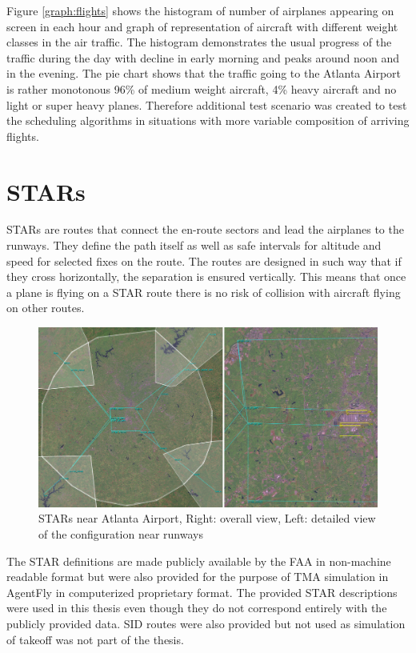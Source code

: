 Figure \ref{graph:flights} shows the histogram of number of airplanes appearing on screen in each hour and graph of representation of aircraft with different weight classes in the air traffic. The histogram demonstrates the usual progress of the traffic during the day with decline in early morning and peaks around noon and in the evening. The pie chart shows that the traffic going to the Atlanta Airport is rather monotonous 96\% of medium weight aircraft, 4\% heavy aircraft and no light or super heavy planes. Therefore additional test scenario was created to test the scheduling algorithms in situations with more variable composition of arriving flights.

\section{STARs}

STARs are routes that connect the en-route sectors and lead the airplanes to the runways. They define the path itself as well as safe intervals for altitude and speed for selected fixes on the route. The routes are designed in such way that if they cross horizontally, the separation is ensured vertically. This means that once a plane is flying on a STAR route there is no risk of collision with aircraft flying on other routes.

\begin{figure}[h]
    \centering
    \includegraphics[width=\textwidth]{figures/routes.png}
    \caption{STARs near Atlanta Airport, Right: overall view, Left: detailed view of the configuration near runways}
    \label{fig:routes}
\end{figure}

The STAR definitions are made publicly available by the FAA in non-machine readable format but were also provided for the purpose of TMA simulation in AgentFly in computerized proprietary format. The provided STAR descriptions were used in this thesis even though they do not correspond entirely with the publicly provided data. SID routes were also provided but not used as simulation of takeoff was not part of the thesis.

